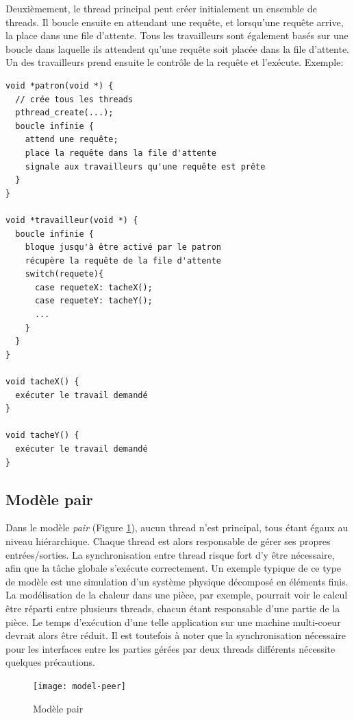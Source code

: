 Deuxièmement, le thread principal peut créer initialement un ensemble de threads. Il boucle ensuite en attendant une requête, et lorsqu'une requête arrive, la place dans une file d'attente. Tous les travailleurs sont également basés sur une boucle dans laquelle ils attendent qu'une requête soit placée dans la file d'attente. Un des travailleurs prend ensuite le contrôle de la requête et l'exécute.
\newpage
Exemple:

\begin{lstlisting}[frame=trBL]
void *patron(void *) {
  // crée tous les threads
  pthread_create(...);
  boucle infinie {
    attend une requête;
    place la requête dans la file d'attente
    signale aux travailleurs qu'une requête est prête
  }
}

void *travailleur(void *) {
  boucle infinie {
    bloque jusqu'à être activé par le patron
    récupère la requête de la file d'attente
    switch(requete){
      case requeteX: tacheX();
      case requeteY: tacheY();
      ...
    }
  }
}

void tacheX() {
  exécuter le travail demandé
}

void tacheY() {
  exécuter le travail demandé
}
\end{lstlisting}

\subsection{Modèle pair}

Dans le modèle \emph{pair} (Figure \ref{fig:model-peer}), aucun thread n'est principal, tous étant égaux au niveau hiérarchique. Chaque thread est alors responsable de gérer ses propres entrées/sorties. La synchronisation entre thread risque fort d'y être nécessaire, afin que la tâche globale s'exécute correctement. Un exemple typique de ce type de modèle est une simulation d'un système physique décomposé en éléments finis. La modélisation de la chaleur dans une pièce, par exemple, pourrait voir le calcul être réparti entre plusieurs threads, chacun étant responsable d'une partie de la pièce. Le temps d'exécution d'une telle application sur une machine multi-coeur devrait alors être réduit. Il est toutefois à noter que la synchronisation nécessaire pour les interfaces entre les parties gérées par deux threads différents nécessite quelques précautions.


\begin{figure}[ht]
  \begin{center}
    \texttt{[image: model-peer]}
    \caption{\label{fig:model-peer}Modèle pair}
  \end{center}
\end{figure}


